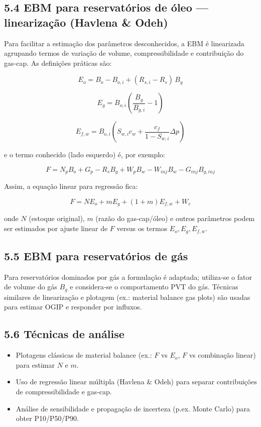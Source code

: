 \documentclass[11pt,a4paper]{article}
\begin{document}
\subsection{5.4 EBM para reservatórios de óleo — linearização (Havlena & Odeh)}
Para facilitar a estimação dos parâmetros desconhecidos, a EBM é linearizada agrupando termos de variação de volume, compressibilidade e contribuição do gas‑cap. As definições práticas são:

$$E_o = B_o - B_{o,i} + (R_{s,i} - R_s)\,B_g$$

$$E_g = B_{o,i}\left(\frac{B_g}{B_{g,i}} - 1\right)$$

$$E_{f,w} = B_{o,i}\left(S_{w,i}c_w + \frac{c_f}{1-S_{w,i}}\Delta p\right)$$

e o termo conhecido (lado esquerdo) é, por exemplo:

$$F = N_p B_o + G_p - R_s B_g + W_p B_w - W_{inj} B_w - G_{inj} B_{g,inj}$$

Assim, a equação linear para regressão fica:

$$F = N E_o + m E_g + (1+m) E_{f,w} + W_e$$

onde $N$ (estoque original), $m$ (razão do gas‑cap/óleo) e outros parâmetros podem ser estimados por ajuste linear de $F$ versus os termos $E_o, E_g, E_{f,w}$.

\subsection{5.5 EBM para reservatórios de gás}
Para reservatórios dominados por gás a formulação é adaptada; utiliza‑se o fator de volume do gás $B_g$ e considera‑se o comportamento PVT do gás. Técnicas similares de linearização e plotagem (ex.: material balance gas plots) são usadas para estimar OGIP e responder por influxos.

\subsection{5.6 Técnicas de análise}
\begin{itemize}
\item Plotagens clássicas de material balance (ex.: $F$ vs $E_o$, $F$ vs combinação linear) para estimar $N$ e $m$.
\item Uso de regressão linear múltipla (Havlena & Odeh) para separar contribuições de compressibilidade e gas‑cap.
\item Análise de sensibilidade e propagação de incerteza (p.ex. Monte Carlo) para obter P10/P50/P90.
\end{itemize}
\end{document}
